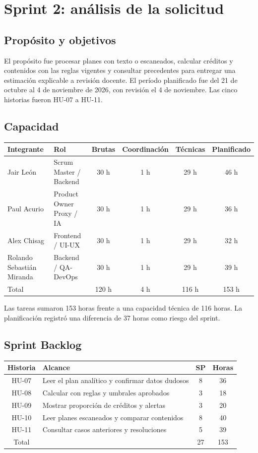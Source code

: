 \section{Sprint 2: análisis de la solicitud}
\subsection{Propósito y objetivos}
El propósito fue procesar planes con texto o escaneados, calcular créditos y contenidos con las reglas vigentes y consultar precedentes para entregar una estimación explicable a revisión docente. El período planificado fue del 21 de octubre al 4 de noviembre de 2026, con revisión el 4 de noviembre. Las cinco historias fueron HU-07 a HU-11.

\subsection{Capacidad}
\begin{tabularx}{\textwidth}{|X|l|c|c|c|c|}\hline\rowcolor{grisTarjeta}\textbf{Integrante} & \textbf{Rol} & \textbf{Brutas} & \textbf{Coordinación} & \textbf{Técnicas} & \textbf{Planificado}\\\hline
Jair León & Scrum Master / Backend & 30 h & 1 h & 29 h & 46 h\\\hline Paul Acurio & Product Owner Proxy / IA & 30 h & 1 h & 29 h & 36 h\\\hline Alex Chisag & Frontend / UI-UX & 30 h & 1 h & 29 h & 32 h\\\hline Rolando Sebastián Miranda & Backend / QA-DevOps & 30 h & 1 h & 29 h & 39 h\\\hline Total & & 120 h & 4 h & 116 h & 153 h\\\hline
\end{tabularx}
Las tareas sumaron 153 horas frente a una capacidad técnica de 116 horas. La planificación registró una diferencia de 37 horas como riesgo del sprint.

\subsection{Sprint Backlog}
\begin{tabularx}{\textwidth}{|c|X|c|c|}\hline\rowcolor{grisTarjeta}\textbf{Historia} & \textbf{Alcance} & \textbf{SP} & \textbf{Horas}\\\hline
HU-07 & Leer el plan analítico y confirmar datos dudosos & 8 & 36\\\hline HU-08 & Calcular con reglas y umbrales aprobados & 3 & 18\\\hline HU-09 & Mostrar proporción de créditos y alertas & 3 & 20\\\hline HU-10 & Leer planes escaneados y comparar contenidos & 8 & 40\\\hline HU-11 & Consultar casos anteriores y resoluciones & 5 & 39\\\hline Total & & 27 & 153\\\hline
\end{tabularx}

